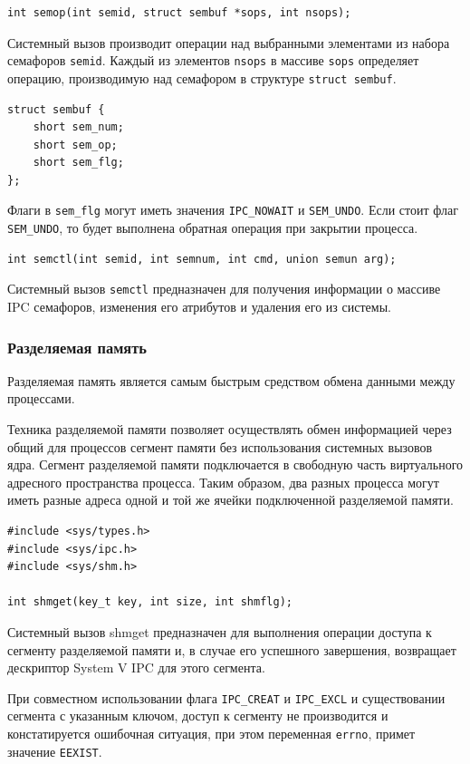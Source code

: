 \documentclass[a4paper,14pt]{extarticle}
\begin{document}
\begin{verbatim}
int semop(int semid, struct sembuf *sops, int nsops);
\end{verbatim}

Системный вызов производит операции над выбранными элементами из набора семафоров \verb|semid|. Каждый из элементов \verb|nsops| в массиве \verb|sops| определяет операцию, производимую над семафором в структуре \verb|struct sembuf|.

\begin{verbatim}
struct sembuf {
    short sem_num;
    short sem_op;
    short sem_flg;
};
\end{verbatim}

Флаги в \verb|sem_flg| могут иметь значения \verb|IPC_NOWAIT| и \verb|SEM_UNDO|. Если стоит флаг \verb|SEM_UNDO|, то будет выполнена обратная операция при закрытии процесса.
\begin{verbatim}
int semctl(int semid, int semnum, int cmd, union semun arg);
\end{verbatim}

Системный вызов \verb|semctl| предназначен для получения информации о массиве IPC семафоров, изменения его атрибутов и удаления его из системы.

\subsubsection{Разделяемая память}

Разделяемая память является самым быстрым средством обмена данными между процессами.

Техника разделяемой памяти позволяет осуществлять обмен информацией через общий для процессов сегмент памяти без использования системных вызовов ядра. Сегмент разделяемой памяти подключается в свободную часть виртуального адресного пространства процесса. Таким образом, два разных процесса могут иметь разные адреса одной и той же ячейки подключенной разделяемой памяти.

\begin{verbatim}
#include <sys/types.h>
#include <sys/ipc.h>
#include <sys/shm.h>

int shmget(key_t key, int size, int shmflg);
\end{verbatim}

Системный вызов shmget предназначен для выполнения операции доступа к сегменту разделяемой памяти и, в случае его успешного завершения, возвращает дескриптор System V IPC для этого сегмента.

При совместном использовании флага \verb|IPC_CREAT| и \verb|IPC_EXCL| и существовании сегмента с указанным ключом, доступ к сегменту не производится и констатируется ошибочная ситуация, при этом переменная \verb|errno|, примет значение \verb|EEXIST|.
\end{document}
